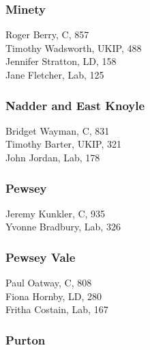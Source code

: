 \documentclass[a4paper,openany,10pt]{book}
\begin{document}
\subsubsection*{Minety}



Roger Berry, C, 857\\
Timothy Wadsworth, UKIP, 488\\
Jennifer Stratton, LD, 158\\
Jane Fletcher, Lab, 125\\


\subsubsection*{Nadder and East Knoyle}



Bridget Wayman, C, 831\\
Timothy Barter, UKIP, 321\\
John Jordan, Lab, 178\\


\subsubsection*{Pewsey}



Jeremy Kunkler, C, 935\\
Yvonne Bradbury, Lab, 326\\


\subsubsection*{Pewsey Vale}



Paul Oatway, C, 808\\
Fiona Hornby, LD, 280\\
Fritha Costain, Lab, 167\\


\subsubsection*{Purton}

\end{document}
